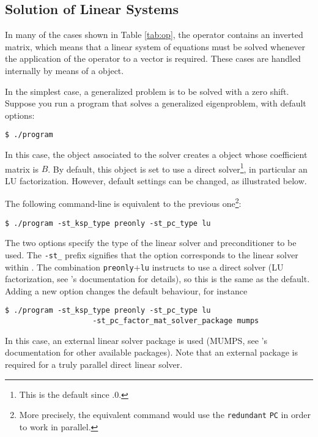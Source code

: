 \subsection{Solution of Linear Systems}
\label{sec:lin}

	In many of the cases shown in Table \ref{tab:op}, the operator contains an inverted matrix, which means that a linear system of equations must be solved whenever the application of the operator to a vector is required. These cases are handled internally by means of a  object.

	In the simplest case, a generalized problem is to be solved with a zero shift. Suppose you run a program that solves a generalized eigenproblem, with default options:
\begin{Verbatim}[fontsize=\small]
	$ ./program
\end{Verbatim}
In this case, the  object associated to the  solver creates a  object whose coefficient matrix is $B$. By default, this  object is set to use a direct solver\footnote{This is the default since .0.}, in particular an LU factorization. However, default settings can be changed, as illustrated below.

	The following command-line is equivalent to the previous one\footnote{More precisely, the equivalent command would use the \texttt{redundant} \texttt{PC} in order to work in parallel.}:
\begin{Verbatim}[fontsize=\small]
	$ ./program -st_ksp_type preonly -st_pc_type lu
\end{Verbatim}
The two options specify the type of the linear solver and preconditioner to be used. The \Verb!-st_! prefix signifies that the option corresponds to the linear solver within . The combination \texttt{preonly}$+$\texttt{lu} instructs to use a direct solver (LU factorization, see \petsc's documentation for details), so this is the same as the default. Adding a new option changes the default behaviour, for instance
\begin{Verbatim}[fontsize=\small]
	$ ./program -st_ksp_type preonly -st_pc_type lu
                    -st_pc_factor_mat_solver_package mumps
\end{Verbatim}
In this case, an external linear solver package is used (MUMPS, see \petsc's documentation for other available packages). Note that an external package is required for a truly parallel direct linear solver.

